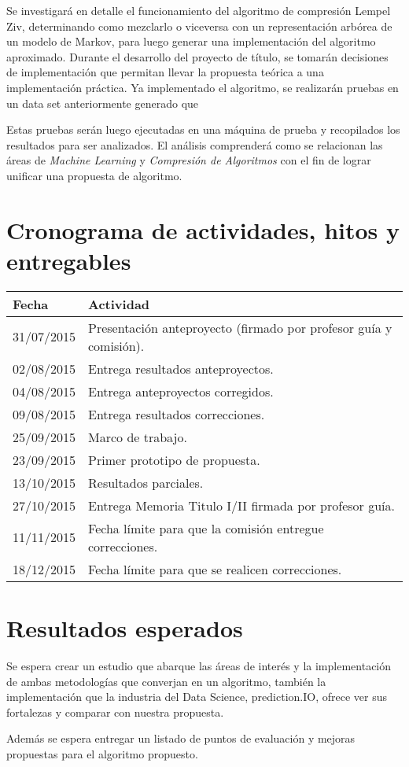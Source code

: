\documentclass{udparticle}
\begin{document}
Se investigará en detalle el funcionamiento del algoritmo de compresión Lempel Ziv, determinando como mezclarlo o viceversa con un representación arbórea de un modelo de Markov, para luego generar una implementación del algoritmo aproximado.
Durante el desarrollo del proyecto de título, se tomarán decisiones de implementación que permitan llevar la propuesta teórica a una implementación práctica. Ya implementado el algoritmo, se realizarán pruebas en un data set anteriormente generado que 

Estas pruebas serán luego ejecutadas en una máquina de prueba y recopilados los resultados para ser analizados.
El análisis comprenderá como se relacionan las áreas de \emph{Machine Learning} y \emph{Compresión de Algoritmos} con el fin de lograr unificar una propuesta de algoritmo. 

\section{Cronograma de actividades, hitos y entregables}
  \begin{center}
  \begin{tabular}{ll}
  \hline\noalign{\smallskip}
  Fecha & Actividad \\
  \hline\noalign{\smallskip}
  31/07/2015 & Presentación anteproyecto (firmado por profesor guía y comisión).\\
  02/08/2015 & Entrega resultados anteproyectos.\\
  04/08/2015 & Entrega anteproyectos corregidos.\\
  09/08/2015 & Entrega resultados correcciones.\\
  25/09/2015 & Marco de trabajo.\\
  23/09/2015 & Primer prototipo de propuesta.\\
  13/10/2015 & Resultados parciales.\\
  27/10/2015 & Entrega Memoria Titulo I/II firmada por profesor guía.\\
  11/11/2015 & Fecha límite para que la comisión entregue correcciones.\\
  18/12/2015 & Fecha límite para que se realicen correcciones.\\
  \hline
  \end{tabular}
  \end{center}


\section{Resultados esperados}

Se espera crear un estudio que abarque las áreas de interés y la implementación de ambas metodologías que converjan en un algoritmo, 
también la implementación que la industria del Data Science, prediction.IO, ofrece ver sus fortalezas y comparar con nuestra propuesta.

Además se espera entregar un listado de puntos de evaluación y mejoras propuestas para el algoritmo propuesto.

  
% 


 
\end{document}
